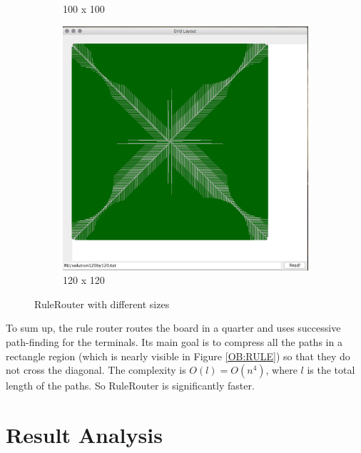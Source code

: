\documentclass{article}
\begin{document}
\begin{spacing}{1.1}
\begin{figure}[H]
\begin{subfigure}{0.4\textwidth}
            \caption{100 x 100}
        \end{subfigure}
        \begin{subfigure}{0.4\textwidth}
            \includegraphics[width = \textwidth]{RU3.png}
            \caption{120 x 120}
        \end{subfigure}
        \caption{RuleRouter with different sizes}
    \end{figure}
    To sum up, the rule router routes the board in a quarter and uses successive path-finding for the terminals. Its main goal is to compress all the paths in a rectangle region (which is nearly visible in Figure \ref{OB:RULE}) so that they do not cross the diagonal. The complexity is $O(l) = O(n^4)$, where $l$ is the total length of the paths. So RuleRouter is significantly faster.
    \section{Result Analysis}

\end{spacing}
\end{document}
